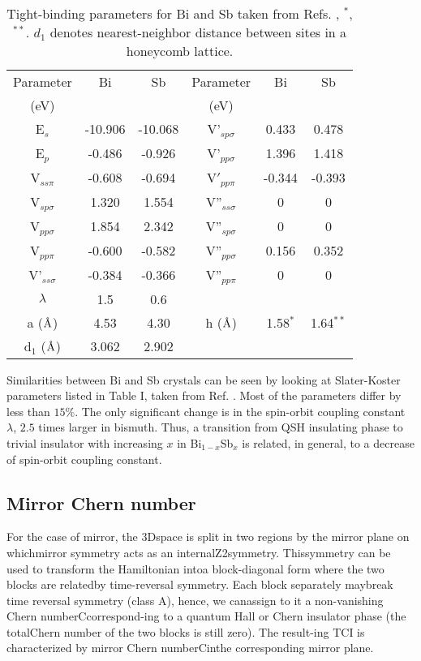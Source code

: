 \begin{table}
\centering
\begin{tabular}{|c|c|c||c|c|c|}
\hline 
Parameter & Bi & Sb & Parameter  & Bi & Sb \\ 
 (eV) &  &  & (eV)  &  &  \\ \hline
E$_{s}$ & -10.906 & -10.068 & V'$_{sp\sigma}$ & 0.433 & 0.478 \\ 
E$_{p}$ & -0.486 & -0.926 & V'$_{pp\sigma}$  & 1.396 & 1.418  \\
V$_{ss\pi}$ & -0.608 & -0.694 & V$'_{pp\pi}$ & -0.344 & -0.393 \\
V$_{sp\sigma}$ & 1.320 & 1.554 & V''$_{ss\sigma}$ & 0 & 0 \\
V$_{pp\sigma}$ & 1.854 & 2.342 & V''$_{sp\sigma}$ & 0 & 0\\
V$_{pp\pi}$& -0.600 & -0.582 & V''$_{pp\sigma}$ & 0.156 & 0.352 \\
V'$_{ss\sigma}$& -0.384 & -0.366 & V''$_{pp\pi}$ & 0 & 0\\
$\lambda$ & 1.5 & 0.6 &   & & \\
\hline
a ($\textnormal{\AA}$) & 4.53 & 4.30 & h ($\textnormal{\AA}$) & 1.58$^{*}$ & 1.64$^{**}$ \\
d$_1$ ($\textnormal{\AA}$) & 3.062 & 2.902 &  &  &\\
\hline
\end{tabular} 
\caption{Tight-binding parameters for Bi and Sb taken from Refs. \cite{Liu:Allen}, \cite{stable:bi111}$^*$, \cite{Sb:nontriv}$^{**}$. $d_1$ denotes nearest-neighbor distance between sites in a honeycomb lattice.}
\label{tab:TB}
\end{table}

Similarities between Bi and Sb crystals can be seen by looking at Slater-Koster parameters listed in Table I, taken from Ref. \cite{Liu:Allen}. Most of the parameters differ by less than $15\%$. The only significant change is in the spin-orbit coupling constant $\lambda$, $2.5$ times larger in bismuth. Thus, a transition from QSH insulating phase to trivial insulator with increasing $x$ in Bi$_{1-x}$Sb$_x$ is related, in general, to a decrease of spin-orbit coupling constant.


\subsection{Mirror Chern number}

For the case of mirror, the 3Dspace is split in two regions by the mirror plane on whichmirror symmetry acts as an internalZ2symmetry.  Thissymmetry can be used to transform the Hamiltonian intoa block-diagonal form where the two blocks are relatedby time-reversal symmetry.  Each block separately maybreak  time  reversal  symmetry  (class  A),  hence,  we  canassign to it a non-vanishing Chern numberCcorrespond-ing to a quantum Hall or Chern insulator phase (the totalChern number of the two blocks is still zero).  The result-ing TCI is characterized by mirror Chern numberCinthe corresponding mirror plane.

